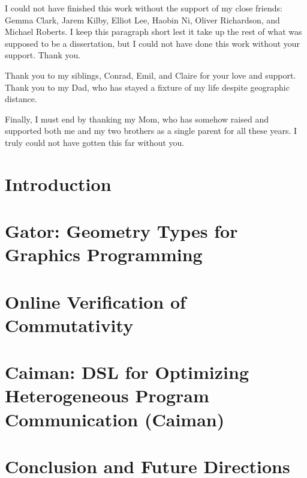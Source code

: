 \documentclass[phd,tocprelim]{cornell}
\begin{document}
\begin{acknowledgements}
I could not have finished this work without the support of my close friends: Gemma Clark, Jarem Kilby, Elliot Lee, Haobin Ni, Oliver Richardson, and Michael Roberts.  I keep this paragraph short lest it take up the rest of what was supposed to be a dissertation, but I could not have done this work without your support.  Thank you.

Thank you to my siblings, Conrad, Emil, and Claire for your love and support.  Thank you to my Dad, who has stayed a fixture of my life despite geographic distance.

Finally, I must end by thanking my Mom, who has somehow raised and supported both me and my two brothers as a single parent for all these years.  I truly could not have gotten this far without you.

\end{acknowledgements}

\contentspage
\tablelistpage
\figurelistpage

\normalspacing \setcounter{page}{1} 
\pagestyle{cornell} \addtolength{\parskip}{0.5\baselineskip}

\chapter{Introduction}



\chapter{Gator: Geometry Types for Graphics Programming}



\chapter{Online Verification of Commutativity}



\chapter{Caiman: DSL for Optimizing Heterogeneous Program Communication (Caiman)}



\chapter{Conclusion and Future Directions}
\end{document}
